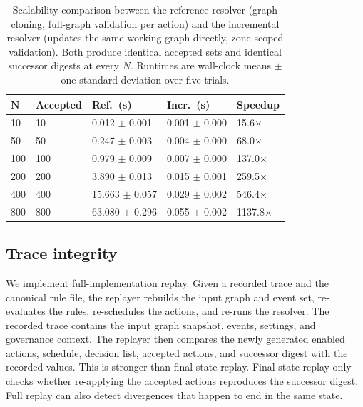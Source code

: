 \documentclass{ieeeaccess}
\theoremstyle{definition}
\theoremstyle{plain}
\theoremstyle{remark}
\begin{document}
\begin{table}[t]
\caption{Scalability comparison between the reference resolver (graph cloning, full-graph validation per action) and the incremental resolver (updates the same working graph directly, zone-scoped validation). Both produce identical accepted sets and identical successor digests at every $N$. Runtimes are wall-clock means $\pm$ one standard deviation over five trials.}
\label{tab:scalability}
\centering
\small
\begin{tabular}{|p{0.3cm}|p{1.1cm}|p{1.9cm}|p{1.9cm}|p{1.4cm}|}
\hline
$\mathbf{N}$ & \textbf{Accepted} & \textbf{Ref.~(s)} & \textbf{Incr.~(s)} & \textbf{Speedup} \\
\hline
10 &  10 &  0.012 $\pm$ 0.001 & 0.001 $\pm$ 0.000 &   15.6$\times$ \\
\hline
 50 &  50 &  0.247 $\pm$ 0.003 & 0.004 $\pm$ 0.000 &   68.0$\times$ \\
\hline
100 & 100 &  0.979 $\pm$ 0.009 & 0.007 $\pm$ 0.000 &  137.0$\times$ \\
\hline
200 & 200 &  3.890 $\pm$ 0.013 & 0.015 $\pm$ 0.001 &  259.5$\times$ \\
\hline
400 & 400 & 15.663 $\pm$ 0.057 & 0.029 $\pm$ 0.002 &  546.4$\times$ \\
\hline
800 & 800 & 63.080 $\pm$ 0.296 & 0.055 $\pm$ 0.002 & 1137.8$\times$ \\
\hline
\end{tabular}
\end{table}

\subsection{Trace integrity}
\label{sec:eval:trace}

We implement full-implementation replay. Given a recorded trace and the canonical rule file, the replayer rebuilds the input graph and event set, re-evaluates the rules, re-schedules the actions, and re-runs the resolver. The recorded trace contains the input graph snapshot, events, settings, and governance context. The replayer then compares the newly generated enabled actions, schedule, decision list, accepted actions, and successor digest with the recorded values. This is stronger than final-state replay. Final-state replay only checks whether re-applying the accepted actions reproduces the successor digest. Full replay can also detect divergences that happen to end in the same state.
\end{document}
